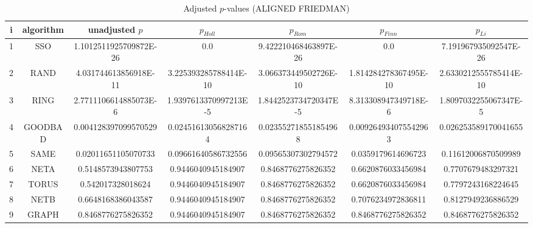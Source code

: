 \documentclass[a4paper,10pt]{article}
\begin{document}
\begin{landscape}
\begin{table}[!htp]
\centering\scriptsize
\caption{Adjusted $p$-values (ALIGNED FRIEDMAN)}
\begin{tabular}{ccccccc}
i&algorithm&unadjusted $p$&$p_{Holl}$&$p_{Rom}$&$p_{Finn}$&$p_{Li}$\\
\hline
1& SSO&1.1012511925709872E-26&0.0&9.422210468463897E-26&0.0&7.191967935092547E-26\\
2& RAND&4.031744613856918E-11&3.225393285788414E-10&3.066373449502726E-10&1.814284278367495E-10&2.6330212555785414E-10\\
3& RING&2.7711106614885073E-6&1.9397613370997213E-5&1.8442523734720347E-5&8.313308947349718E-6&1.8097032255067347E-5\\
4& GOODBAD&0.004128397099570529&0.024516130568287164&0.023552718551854968&0.009264934075542963&0.026253589170041655\\
5& SAME&0.02011651105070733&0.09661640586732556&0.09565307302794572&0.0359179614696723&0.11612006870509989\\
6& NETA&0.5148573943807753&0.9446040945184907&0.8468776275826352&0.6620876033456984&0.7707679483297321\\
7& TORUS&0.542017328018624&0.9446040945184907&0.8468776275826352&0.6620876033456984&0.7797243168224645\\
8& NETB&0.6648168386043587&0.9446040945184907&0.8468776275826352&0.7076234972836811&0.8127949236886529\\
9& GRAPH&0.8468776275826352&0.9446040945184907&0.8468776275826352&0.8468776275826352&0.8468776275826352\\
\hline
\end{tabular}
\end{table}


\newpage


\end{landscape}
\end{document}
